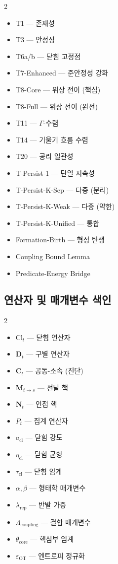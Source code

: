 \begin{multicols}{2}
\begin{itemize}
\item T1 --- 존재성
\item T3 --- 안정성
\item T6a/b --- 닫힘 고정점
\item T7-Enhanced --- 준안정성 강화
\item T8-Core --- 위상 전이 (핵심)
\item T8-Full --- 위상 전이 (완전)
\item T11 --- $\Gamma$-수렴
\item T14 --- 기울기 흐름 수렴
\item T20 --- 공리 일관성
\item T-Persist-1 --- 단일 지속성
\item T-Persist-K-Sep --- 다중 (분리)
\item T-Persist-K-Weak --- 다중 (약한)
\item T-Persist-K-Unified --- 통합
\item Formation-Birth --- 형성 탄생
\item Coupling Bound Lemma
\item Predicate-Energy Bridge
\end{itemize}
\end{multicols}


\subsection{연산자 및 매개변수 색인}

\begin{multicols}{2}
\begin{itemize}
\item $\mathrm{Cl}_t$ --- 닫힘 연산자
\item $\mathbf{D}_t$ --- 구별 연산자
\item $\mathbf{C}_t$ --- 공동-소속 (진단)
\item $\mathbf{M}_{t \to s}$ --- 전달 핵
\item $\mathbf{N}_t$ --- 인접 핵
\item $P_t$ --- 집계 연산자
\item $a_{\mathrm{cl}}$ --- 닫힘 강도
\item $\eta_{\mathrm{cl}}$ --- 닫힘 균형
\item $\tau_{\mathrm{cl}}$ --- 닫힘 임계
\item $\alpha, \beta$ --- 형태학 매개변수
\item $\lambda_{\mathrm{rep}}$ --- 반발 가중
\item $\Lambda_{\mathrm{coupling}}$ --- 결합 매개변수
\item $\theta_{\mathrm{core}}$ --- 핵심부 임계
\item $\varepsilon_{\mathrm{OT}}$ --- 엔트로피 정규화
\end{itemize}
\end{multicols}
